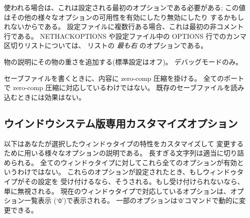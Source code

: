 使われる場合は、これは設定される最初のオプションである必要がある;
この値はその他の様々なオプションの可用性を有効にしたり無効にしたり
するかもしれないからである。
設定ファイルに複数行ある場合、これは最初の非コメント行である。
NETHACKOPTIONS や設定ファイル中の OPTIONS 行でのカンマ区切りリストについては、
リストの {\it 最も右\/} のオプションである。
\item[\ib{wizweight}]
物の説明にその物の重さを追加する(標準設定はオフ)。
デバッグモードのみ。
\item[\ib{zerocomp}]
セーブファイルを書くときに、内容に zero-comp 圧縮を掛ける。
全てのポートで zero-comp 圧縮に対応しているわけではない。
既存のセーブファイルを読み込むときには効果はない。
\elist

\subsection*{ウインドウシステム版専用カスタマイズオプション}

以下はあなたが選択したウィンドゥタイプの特性をカスタマイズして
変更するために用いる様々なオプションの説明である。
長すぎる文字列は適当に切り詰められる。
全てのウィンドゥタイプに対してこれら全てのオプションが有効というわけではない。
これらのオプションが設定されたとき、もしウィンドゥタイプがその設定を
受け付けるなら、そうされる。もし受け付けられないなら、単に無視される。
現在のウィンドゥタイプで対応しているオプションは、オプション一覧表示
(`{\tt O}')で表示される。
一部のオプションは`{\tt O}'コマンドで動的に変更できる。

